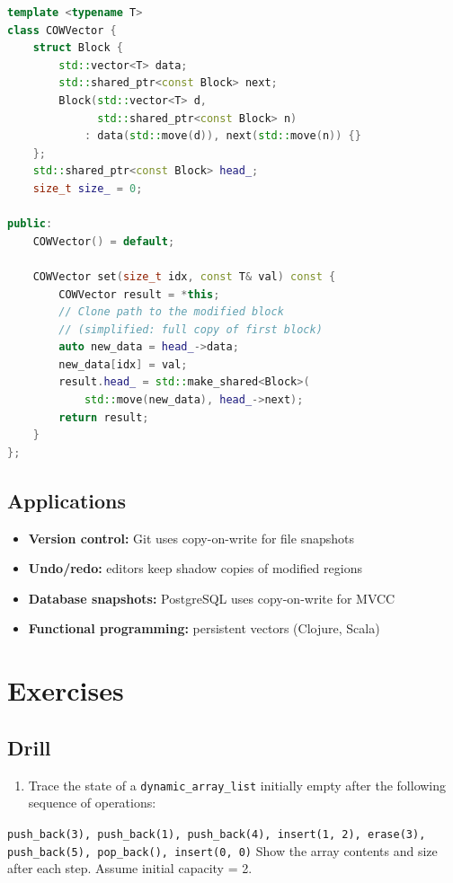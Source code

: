 \begin{lstlisting}[language=C++]
template <typename T>
class COWVector {
    struct Block {
        std::vector<T> data;
        std::shared_ptr<const Block> next;
        Block(std::vector<T> d,
              std::shared_ptr<const Block> n)
            : data(std::move(d)), next(std::move(n)) {}
    };
    std::shared_ptr<const Block> head_;
    size_t size_ = 0;

public:
    COWVector() = default;

    COWVector set(size_t idx, const T& val) const {
        COWVector result = *this;
        // Clone path to the modified block
        // (simplified: full copy of first block)
        auto new_data = head_->data;
        new_data[idx] = val;
        result.head_ = std::make_shared<Block>(
            std::move(new_data), head_->next);
        return result;
    }
};
\end{lstlisting}

\subsection{Applications}

\begin{itemize}
    \item \textbf{Version control:} Git uses copy-on-write for file snapshots
    \item \textbf{Undo/redo:} editors keep shadow copies of modified regions
    \item \textbf{Database snapshots:} PostgreSQL uses copy-on-write for MVCC
    \item \textbf{Functional programming:} persistent vectors (Clojure, Scala)
\end{itemize}

\section{Exercises}

\subsection{Drill}

\begin{enumerate}
\item Trace the state of a \texttt{dynamic\_array\_list} initially empty after the following sequence of operations:
\end{enumerate}
   \texttt{push\_back(3), push\_back(1), push\_back(4), insert(1, 2), erase(3), push\_back(5), pop\_back(), insert(0, 0)}
   Show the array contents and size after each step. Assume initial capacity = 2.

